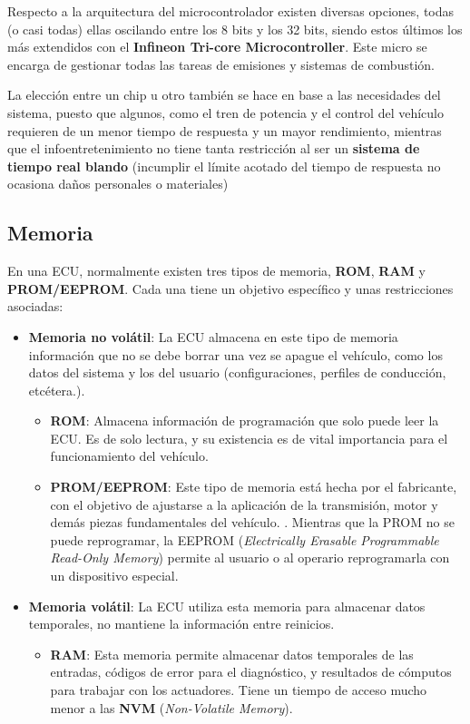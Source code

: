 Respecto a la arquitectura del microcontrolador existen diversas opciones, todas (o casi todas) ellas oscilando entre los 8 bits y los 32 bits\cite{micros}, siendo estos últimos los más extendidos con el \textbf{Infineon Tri-core Microcontroller\cite{infineon}}. Este micro se encarga de gestionar todas las tareas de emisiones y sistemas de combustión. 

La elección entre un chip u otro también se hace en base a las necesidades del sistema, puesto que algunos, como el tren de potencia y el control del vehículo requieren de un menor tiempo de respuesta y un mayor rendimiento, mientras que el infoentretenimiento no tiene tanta restricción al ser un \textbf{sistema de tiempo real blando} (incumplir el límite acotado del tiempo de respuesta no ocasiona daños personales o materiales)

\subsection{Memoria}

En una ECU, normalmente existen tres tipos de memoria, \textbf{ROM}, \textbf{RAM} y \textbf{PROM/EEPROM}. Cada una tiene un objetivo específico y unas restricciones asociadas:

\begin{itemize}
    \item \textbf{Memoria no volátil}: La ECU almacena en este tipo de memoria información que no se debe borrar una vez se apague el vehículo, como los datos del sistema y los del usuario (configuraciones, perfiles de conducción, etcétera.).\cite{ram_nvm}
    \begin{itemize}
        \item \textbf{ROM}: Almacena información de programación que solo puede leer la ECU. Es de solo lectura, y su existencia es de vital importancia para el funcionamiento del vehículo.
        \item \textbf{PROM/EEPROM}: Este tipo de memoria está hecha por el fabricante, con el objetivo de ajustarse a la aplicación de la transmisión, motor y demás piezas fundamentales del vehículo. \cite{eeprom}. Mientras que la PROM no se puede reprogramar, la EEPROM (\textit{Electrically Erasable Programmable Read-Only Memory}) permite al usuario o al operario reprogramarla con un dispositivo especial. 
    \end{itemize}
    \item \textbf{Memoria volátil}: La ECU utiliza esta memoria para almacenar datos temporales, no mantiene la información entre reinicios.
    \begin{itemize}
        \item \textbf{RAM}: Esta memoria permite almacenar datos temporales de las entradas, códigos de error para el diagnóstico, y resultados de cómputos para trabajar con los actuadores. Tiene un tiempo de acceso mucho menor a las \textbf{NVM} (\textit{Non-Volatile Memory}).
    \end{itemize}
\end{itemize}


